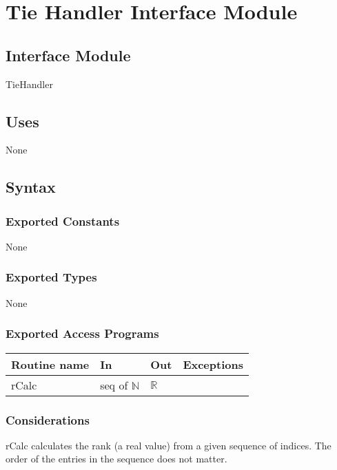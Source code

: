 \documentclass[12pt,fleqn]{examtst}
\begin{document}

\newpage

\section* {Tie Handler Interface Module}

\subsection*{Interface Module}

TieHandler

\subsection* {Uses}

None

\subsection* {Syntax}

\subsubsection* {Exported Constants}

None

\subsubsection* {Exported Types}

None 

\subsubsection* {Exported Access Programs}

\begin{tabular}{| l | l | l | p{5cm} |}
\hline
\textbf{Routine name} & \textbf{In} & \textbf{Out} & \textbf{Exceptions}\\
\hline
rCalc & seq of $\mathbb{N}$ & $\mathbb{R}$ & ~\\
\hline
\end{tabular}

\subsubsection* {Considerations}

rCalc calculates the rank (a real value) from a given sequence of indices.
The order of the entries in the sequence does not matter.
\end{document}
